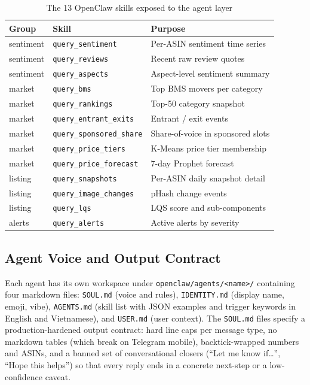 \begin{table}[H]
  \centering
  \begin{tabular}{lll}
    \toprule
    \textbf{Group} & \textbf{Skill} & \textbf{Purpose} \\
    \midrule
    sentiment & \texttt{query\_sentiment}      & Per-ASIN sentiment time series \\
    sentiment & \texttt{query\_reviews}        & Recent raw review quotes \\
    sentiment & \texttt{query\_aspects}        & Aspect-level sentiment summary \\
    market    & \texttt{query\_bms}            & Top BMS movers per category \\
    market    & \texttt{query\_rankings}       & Top-50 category snapshot \\
    market    & \texttt{query\_entrant\_exits} & Entrant / exit events \\
    market    & \texttt{query\_sponsored\_share} & Share-of-voice in sponsored slots \\
    market    & \texttt{query\_price\_tiers}   & K-Means price tier membership \\
    market    & \texttt{query\_price\_forecast} & 7-day Prophet forecast \\
    listing   & \texttt{query\_snapshots}      & Per-ASIN daily snapshot detail \\
    listing   & \texttt{query\_image\_changes} & pHash change events \\
    listing   & \texttt{query\_lqs}            & LQS score and sub-components \\
    alerts    & \texttt{query\_alerts}         & Active alerts by severity \\
    \bottomrule
  \end{tabular}
  \caption{The 13 OpenClaw skills exposed to the agent layer}
  \label{tab:skills}
\end{table}

\subsection{Agent Voice and Output Contract}

Each agent has its own workspace under \texttt{openclaw/agents/<name>/}
containing four markdown files: \texttt{SOUL.md} (voice and rules),
\texttt{IDENTITY.md} (display name, emoji, vibe), \texttt{AGENTS.md} (skill
list with JSON examples and trigger keywords in English and Vietnamese), and
\texttt{USER.md} (user context). The \texttt{SOUL.md} files specify a
production-hardened output contract: hard line caps per message type,
no markdown tables (which break on Telegram mobile), backtick-wrapped
numbers and ASINs, and a banned set of conversational closers
(``Let me know if\ldots'', ``Hope this helps'') so that every reply ends in a
concrete next-step or a low-confidence caveat.

